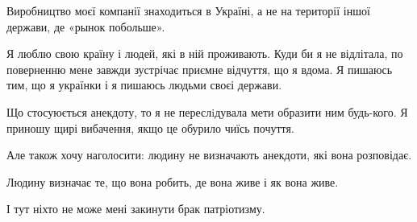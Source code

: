 Виробництво моєї компанії знаходиться в Україні, а не на території іншої
держави, де «рынок побольше».

Я люблю свою країну і людей, які в ній проживають. Куди би я не відлітала, по
поверненню мене завжди зустрічає приємне відчуття, що я вдома. Я пишаюсь тим,
що я українки і я пишаюсь людьми своєі держави. 

Що стосуюється анекдоту, то я не переслiдувала мети образити ним будь-кого. Я
приношу щирі вибачення, якщо це обурило чиїсь почуття.

Але також хочу наголосити: людину не визначають анекдоти, які вона розповідає.

Людину визначає те, що вона робить, де вона живе і як вона живе.

І тут ніхто не може мені закинути брак патріотизму.

